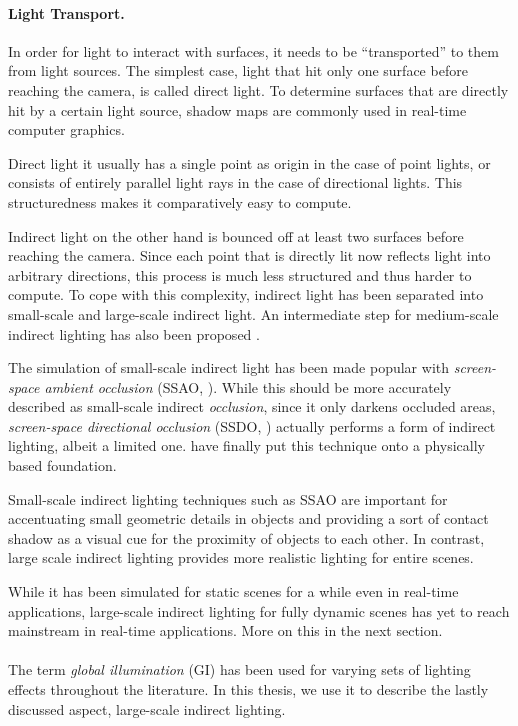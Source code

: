 \paragraph{Light Transport.}

In order for light to interact with surfaces, it needs to be ``transported'' to them from light sources. The simplest case, light that hit only one surface before reaching the camera, is called direct light. To determine surfaces that are directly hit by a certain light source, shadow maps are commonly used in real-time computer graphics.

Direct light it usually has a single point as origin in the case of point lights, or consists of entirely parallel light rays in the case of directional lights. This structuredness makes it comparatively easy to compute.

Indirect light on the other hand is bounced off at least two surfaces before reaching the camera. Since each point that is directly lit now reflects light into arbitrary directions, this process is much less structured and thus harder to compute. To cope with this complexity, indirect light has been separated into small-scale and large-scale indirect light. An intermediate step for medium-scale indirect lighting has also been proposed \citep{reed:2012:mediumAO}.

The simulation of small-scale indirect light has been made popular with \textit{screen-space ambient occlusion} (SSAO, \cite{Mittring:2007:Cryengine2}). While this should be more accurately described as small-scale indirect \textit{occlusion}, since it only darkens occluded areas, \textit{screen-space directional occlusion} (SSDO, \cite{Ritschel:2009:SSDO}) actually performs a form of indirect lighting, albeit a limited one. \citet{jimenez:2016:AO} have finally put this technique onto a physically based foundation.

Small-scale indirect lighting techniques such as SSAO are important for accentuating small geometric details in objects and providing a sort of contact shadow as a visual cue for the proximity of objects to each other. In contrast, large scale indirect lighting provides more realistic lighting for entire scenes.

While it has been simulated for static scenes for a while even in real-time applications, large-scale indirect lighting for fully dynamic scenes has yet to reach mainstream in real-time applications. More on this in the next section.
\\
\\
The term \textit{global illumination} (GI) has been used for varying sets of lighting effects throughout the literature. In this thesis, we use it to describe the lastly discussed aspect, large-scale indirect lighting.



